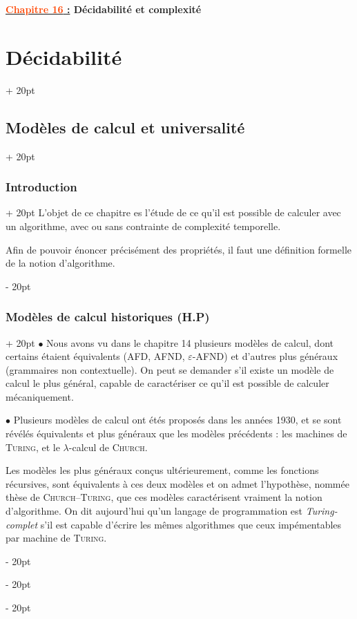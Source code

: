 \documentclass[a4paper, 12pt, twoside]{article}
\newcommand{\Emph}{\textcolor{ff4500}}
\newcommand{\ind}[1][20pt]{\advance\leftskip + #1}
\newcommand{\deind}[1][20pt]{\advance\leftskip - #1}
\newenvironment{indt}[2][20pt]{#2 \par \ind[#1]}{\par \deind} %
\newcommand{\thetitle}[2]{\begin{center}\textbf{{\LARGE \underline{\Emph{#1} :}} {\Large #2}}\end{center}}
\begin{document}
    
    \thetitle{Chapitre 16}{Décidabilité et complexité}
    
    \tableofcontents
    \newpage
    
    \begin{indt}{\section{Décidabilité}}
        \begin{indt}{\subsection{Modèles de calcul et universalité}}
            \begin{indt}{\subsubsection{Introduction}}
                L'objet de ce chapitre es l'étude de ce qu'il est possible de calculer avec un algorithme, avec ou sans contrainte de complexité temporelle.

                Afin de pouvoir énoncer précisément des propriétés, il faut une définition formelle de la notion d'algorithme.
            \end{indt}

            \begin{indt}{\subsubsection{Modèles de calcul historiques (H.P)}}
                $\bullet$ Nous avons vu dans le chapitre 14 plusieurs modèles de calcul, dont certains étaient équivalents (AFD, AFND, $\varepsilon$-AFND) et d'autres plus généraux (grammaires non contextuelle).
                On peut se demander s'il existe un modèle de calcul le plus général, capable de caractériser ce qu'il est possible de calculer mécaniquement.

                $\bullet$ Plusieurs modèles de calcul ont étés proposés dans les années 1930, et se sont révélés équivalents et plus généraux que les modèles précédents : les machines de \textsc{Turing}, et le $\lambda$-calcul de \textsc{Church}.

                Les modèles les plus généraux conçus ultérieurement, comme les fonctions récursives, sont équivalents à ces deux modèles et on admet l'hypothèse, nommée thèse de \textsc{Church}--\textsc{Turing}, que ces modèles caractérisent vraiment la notion d'algorithme.
                On dit aujourd'hui qu'un langage de programmation est \emph{Turing-complet} s'il est capable d'écrire les mêmes algorithmes que ceux impémentables par machine de \textsc{Turing}.


\end{indt}
\end{indt}
\end{indt}
\end{document}
